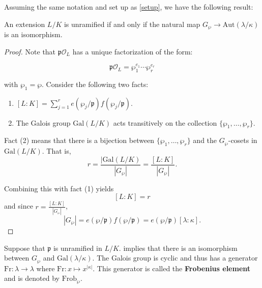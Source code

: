 Assuming the same notation and set up as \ref{setup}, we have the following result:

\begin{proposition}
    An extension $L/K$ is unramified if and only if the natural map $G_\wp \to \textrm{Aut}(\lambda/\kappa)$ is an isomorphism.
\end{proposition}
\begin{proof}
    Note that $\mathfrak{p} \mathcal{O}_{L}$ has a unique factorization of the form:

    \[\mathfrak{p}\mathcal{O}_{L} = \wp_1^{e_1}\cdots \wp_r^{e_r}\]

    with $\wp_1 = \wp$. Consider the following two facts:

    \begin{enumerate}[(1)]
        \item $[L:K] = \sum_{j=1}^r e(\wp_j/\mathfrak{p})f(\wp_j/\mathfrak{p})$.
        \item The Galois group $\textrm{Gal}(L/K)$ acts transitively on the collection $\{\wp_1, \ldots, \wp_r\}$. 
    \end{enumerate}
    Fact (2) means that there is a bijection between $\{\wp_1, \ldots, \wp_r\}$ and the $G_\wp$-cosets in $\textrm{Gal}(L/K)$. That is,
        \[r = \frac{|\textrm{Gal}(L/K)}{|G_\wp|} = \frac{[L:K]}{|G_\wp|}.\]

    Combining this with fact (1) yields
        \[[L:K] = r \]
    and since $r = \frac{[L:K]}{|G_\wp|}$,
        \[|G_\wp| = e(\wp/\mathfrak{p})f(\wp/\mathfrak{p}) = e(\wp/\mathfrak{p})[\lambda:\kappa].\]
\end{proof}





Suppose that $\mathfrak{p}$ is unramified in  $L/K$.  implies that there is an isomorphism between $G_\wp$ and $\textrm{Gal}(\lambda/\kappa)$. The Galois group is cyclic and thus has a generator $\textrm{Fr}: \lambda \to \lambda$ where $\textrm{Fr}: x \mapsto x^{|\kappa|}$. This generator is called the \textbf{Frobenius element} and is denoted by $\textrm{Frob}_\wp$.\\

